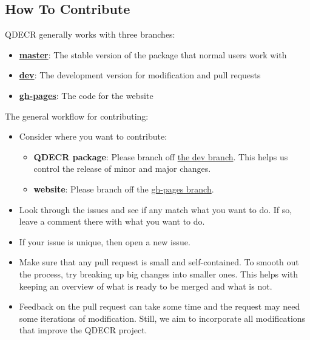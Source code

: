 \documentclass[]{article}
\providecommand{\tightlist}{%
  \setlength{\itemsep}{0pt}\setlength{\parskip}{0pt}}
\begin{document}
\hypertarget{how-to-contribute}{%
\subsection{How To Contribute}\label{how-to-contribute}}

QDECR generally works with three branches:

\begin{itemize}
\tightlist
\item
  \href{https://github.com/slamballais/QDECR/tree/master}{\textbf{master}}:
  The stable version of the package that normal users work with
\item
  \href{https://github.com/slamballais/QDECR/tree/dev}{\textbf{dev}}:
  The development version for modification and pull requests
\item
  \href{https://github.com/slamballais/QDECR/tree/gh-pages}{\textbf{gh-pages}}:
  The code for the website
\end{itemize}

The general workflow for contributing:

\begin{itemize}
\tightlist
\item
  Consider where you want to contribute:

  \begin{itemize}
  \tightlist
  \item
    \textbf{QDECR package}: Please branch off
    \href{https://github.com/slamballais/QDECR/tree/dev}{the dev
    branch}. This helps us control the release of minor and major
    changes.
  \item
    \textbf{website}: Please branch off the
    \href{https://github.com/slamballais/QDECR/tree/gh-pages}{gh-pages
    branch}.
  \end{itemize}
\item
  Look through the issues and see if any match what you want to do. If
  so, leave a comment there with what you want to do.
\item
  If your issue is unique, then open a new issue.
\item
  Make sure that any pull request is small and self-contained. To smooth
  out the process, try breaking up big changes into smaller ones. This
  helps with keeping an overview of what is ready to be merged and what
  is not.
\item
  Feedback on the pull request can take some time and the request may
  need some iterations of modification. Still, we aim to incorporate all
  modifications that improve the QDECR project.
\end{itemize}
\end{document}

